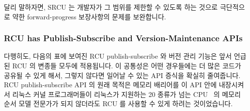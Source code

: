 달리 말하자면, SRCU 는 개발자가 그 범위를 제한할 수 있도록 하는 것으로
극단적으로 약한 forward-progress 보장사항의 문제를 보완합니다.

\subsubsection{RCU has Publish-Subscribe and Version-Maintenance APIs}
\label{sec:defer:RCU has Publish-Subscribe and Version-Maintenance APIs}

다행히도, 다음의 표에 보여진 RCU publish-subscribe 와 버전 관리 기능은 앞서
언급된 RCU 의 변종들 모두에 적용됩니다.
이 공통성은 어떤 경우들에는 더 많은 코드가 공유될 수 있게 해서, 그렇지 않다면
일어날 수 있는 API 증식을 확실히 줄여줍니다.
RCU publish-subscribe API 의 원래 목적은 메모리 배리어를 이 API 안에 내장시켜서
리눅스 커널 프로그래머들이 리눅스가 지원하는 20 종류가 넘는 CPU~\cite{Spraul01}
의 메모리 순서 모델 전문가가 되지 않더라도 RCU 를 사용할 수 있게 하려는
것이었습니다.

